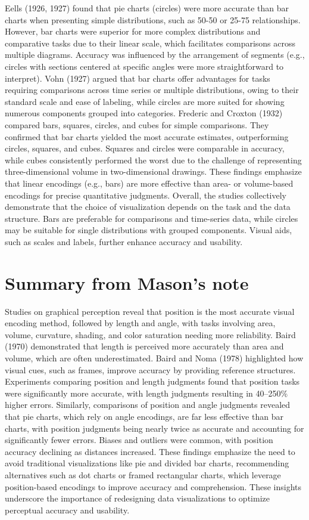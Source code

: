 \documentclass[
  10pt,
  letterpaper,
  twocolumn]{article}
\begin{document}
Eells (1926, 1927) found that pie charts (circles) were more accurate
than bar charts when presenting simple distributions, such as 50-50 or
25-75 relationships. However, bar charts were superior for more complex
distributions and comparative tasks due to their linear scale, which
facilitates comparisons across multiple diagrams. Accuracy was
influenced by the arrangement of segments (e.g., circles with sections
centered at specific angles were more straightforward to interpret).
Vohn (1927) argued that bar charts offer advantages for tasks requiring
comparisons across time series or multiple distributions, owing to their
standard scale and ease of labeling, while circles are more suited for
showing numerous components grouped into categories. Frederic and
Croxton (1932) compared bars, squares, circles, and cubes for simple
comparisons. They confirmed that bar charts yielded the most accurate
estimates, outperforming circles, squares, and cubes. Squares and
circles were comparable in accuracy, while cubes consistently performed
the worst due to the challenge of representing three-dimensional volume
in two-dimensional drawings. These findings emphasize that linear
encodings (e.g., bars) are more effective than area- or volume-based
encodings for precise quantitative judgments. Overall, the studies
collectively demonstrate that the choice of visualization depends on the
task and the data structure. Bars are preferable for comparisons and
time-series data, while circles may be suitable for single distributions
with grouped components. Visual aids, such as scales and labels, further
enhance accuracy and usability.

\hypertarget{summary-from-masons-note}{%
\section{Summary from Mason's note}\label{summary-from-masons-note}}

Studies on graphical perception reveal that position is the most
accurate visual encoding method, followed by length and angle, with
tasks involving area, volume, curvature, shading, and color saturation
needing more reliability. Baird (1970) demonstrated that length is
perceived more accurately than area and volume, which are often
underestimated. Baird and Noma (1978) highlighted how visual cues, such
as frames, improve accuracy by providing reference structures.
Experiments comparing position and length judgments found that position
tasks were significantly more accurate, with length judgments resulting
in 40--250\% higher errors. Similarly, comparisons of position and angle
judgments revealed that pie charts, which rely on angle encodings, are
far less effective than bar charts, with position judgments being nearly
twice as accurate and accounting for significantly fewer errors. Biases
and outliers were common, with position accuracy declining as distances
increased. These findings emphasize the need to avoid traditional
visualizations like pie and divided bar charts, recommending
alternatives such as dot charts or framed rectangular charts, which
leverage position-based encodings to improve accuracy and comprehension.
These insights underscore the importance of redesigning data
visualizations to optimize perceptual accuracy and usability.
\end{document}
